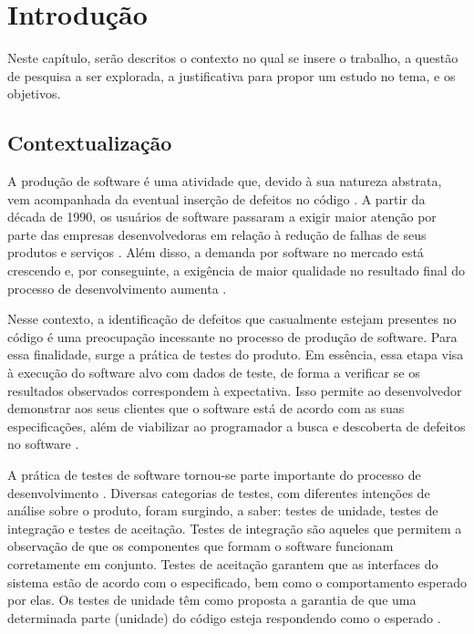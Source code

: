 \chapter[Introdução]{Introdução}

Neste capítulo, serão descritos o contexto no qual se insere o trabalho, a questão de pesquisa a ser explorada, a justificativa para propor um estudo no tema, e os objetivos.

 \section{Contextualização}
  \indent A produção de software é uma atividade que, devido à sua natureza abstrata, vem acompanhada da eventual inserção de defeitos no código \cite{trodo2009}. A partir da década de 1990, os usuários de software passaram a exigir maior atenção por parte das empresas desenvolvedoras em relação à redução de falhas de seus produtos e serviços \cite{sommerville2007}. Além disso, a demanda por software no mercado está crescendo \cite{philipson2004} e, por conseguinte, a exigência de maior qualidade no resultado final do processo de desenvolvimento aumenta \cite{barbosaEtAl2009}.
  \par
  \indent Nesse contexto, a identificação de defeitos que casualmente estejam presentes no código é uma preocupação incessante no processo de produção de software. Para essa finalidade, surge a prática de testes do produto. Em essência, essa etapa visa à execução do software alvo com dados de teste, de forma a verificar se os resultados observados correspondem à expectativa. Isso permite ao desenvolvedor demonstrar aos seus clientes que o software está de acordo com as suas especificações, além de viabilizar ao programador a busca e descoberta de defeitos no software \cite{sommerville2007}.
  \par
  \indent A prática de testes de software tornou-se parte importante do processo de desenvolvimento \cite{barbosaEtAl2009}. Diversas categorias de testes, com diferentes intenções de análise sobre o produto, foram surgindo, a saber: testes de unidade, testes de integração e testes de aceitação. Testes de integração são aqueles que permitem a observação de que os componentes que formam o software funcionam corretamente em conjunto. Testes de aceitação garantem que as interfaces do sistema estão de acordo com o especificado, bem como o comportamento esperado por elas. Os testes de unidade têm como proposta a garantia  de que uma determinada parte (unidade) do código esteja respondendo como o esperado \cite{sommerville2007}.
